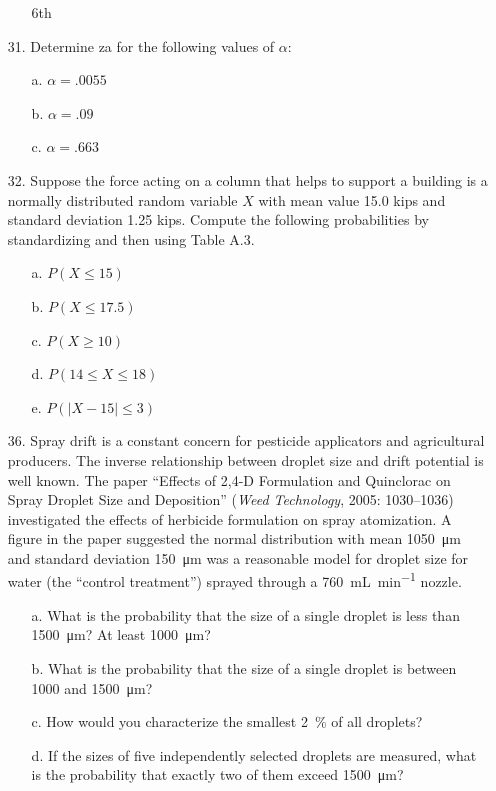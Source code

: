 \documentclass[letterpaper,12pt]{article}
\begin{document}
\begin{enumerate}
\begin{enumerate}
        6th
    \end{enumerate}
  \item[31.]
    Determine za for the following values of $\alpha$:
    \begin{enumerate}
      \item[a.]
        $\alpha = .0055$
      \item[b.]
        $\alpha = .09$
      \item[c.]
        $\alpha = .663$
    \end{enumerate}
  \item[32.]
    Suppose the force acting on a column that helps to support a building is a normally distributed random variable $X$ with mean value 15.0 kips and standard deviation 1.25 kips. Compute the following probabilities by standardizing and then using Table A.3.
    \begin{enumerate}
      \item[a.]
        $P(X \le 15)$
      \item[b.]
        $P(X \le 17.5)$
      \item[c.]
        $P(X \ge 10)$
      \item[d.]
        $P(14 \le X \le 18)$
      \item[e.]
        $P(|X - 15| \le 3)$
    \end{enumerate}
  \item[36.]
    Spray drift is a constant concern for pesticide applicators and agricultural producers. The inverse relationship between droplet size and drift potential is well known. The paper ``Effects of 2,4-D Formulation and Quinclorac on Spray Droplet Size and Deposition'' (\textit{Weed Technology}, 2005: 1030–1036) investigated the effects of herbicide formulation on spray atomization. A figure in the paper suggested the normal distribution with mean \qty{1050}{\micro\meter} and standard deviation \qty{150}{\micro\meter} was a reasonable model for droplet size for water (the ``control treatment'') sprayed through a \qty{760}{\milli\liter\per\minute} nozzle.
    \begin{enumerate}
      \item[a.]
        What is the probability that the size of a single droplet is less than \qty{1500}{\micro\meter}? At least \qty{1000}{\micro\meter}?
      \item[b.]
        What is the probability that the size of a single droplet is between 1000 and \qty{1500}{\micro\meter}?
      \item[c.]
        How would you characterize the smallest \qty{2}{\percent} of all droplets?
      \item[d.]
        If the sizes of five independently selected droplets are measured, what is the probability that exactly two of them exceed \qty{1500}{\micro\meter}?
    \end{enumerate}
\end{enumerate}
\end{document}
